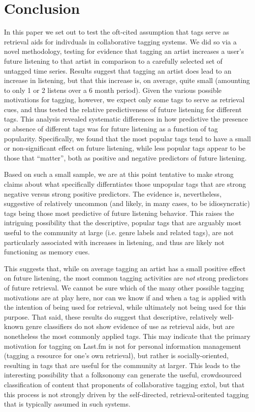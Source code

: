 \section{Conclusion}
\label{sec_conclusion}
In this paper we set out to test the oft-cited assumption that tags serve as retrieval aids for indivduals in collaborative tagging systems.  We did so via a novel methodology, testing for evidence that tagging an artist increases a user's future listening to that artist in comparison to a carefully selected set of untagged time series. Results suggest that tagging an artist does lead to an increase in listening, but that this increase is, on average, quite small (amounting to only 1 or 2 listens over a 6 month period). Given the various possible motivations for tagging, however, we expect only some tags to serve as retrieval cues, and thus tested the relative predictiveness of future listening for different tags. This analysis revealed systematic differences in how predictive the presence or absence of different tags was for future listening as a function of tag popularity. Specifically, we found that the most popular tags tend to have a small or non-significant effect on future listening, while less popular tags appear to be those that ``matter'', both as positive and negative predictors of future listening.

Based on such a small sample, we are at this point tentative to make strong claims about what specifically differntiates those unpopular tags that are strong negative versus strong positive predictors. The evidence is, nevertheless, suggestive of relatively uncommon (and likely, in many cases, to be idiosyncratic) tags being those most predictive of future listening behavior. This raises the intriguing possibility that the descriptive, popular tags that are arguably most useful to the community at large (i.e. genre labels and related tags), are not particularly associated with increases in listening, and thus are likely not functioning as memory cues.

This suggests that, while on average tagging an artist  has a small positive effect on future listening, the most common tagging activities are \emph{not} strong predictors of future retrieval. We cannot be sure which of the many other possible tagging motivations are at play here, nor can we know if and when a tag is applied with the intention of being used for retrieval, while ultimately not being used for this purpose. That said, these results do suggest that descriptive, relatively well-known genre classifiers do not show evidence of use as retrieval aids, but are nonetheless the most commonly applied tags. This may indicate that the primary motivation for tagging on Last.fm is not for personal information management (tagging a resource for one's own retrieval), but rather is socially-oriented, resulting in tags that are useful for the community at larger. This leads to the interesting possibility that a folksonomy can generate the useful, crowdsourced classification of content that proponents of collaborative tagging extol, but that this process is not strongly driven by the self-directed, retrieval-oritented tagging that is typically assumed in such systems.

